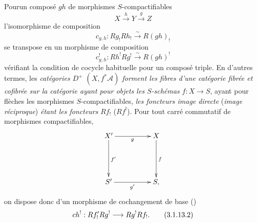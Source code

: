 \documentclass[10pt]{../fichiers-configuration-latex/smfart}
\begin{document}
\setcounter{subsubsection}{12}
\subsubsection{}
Pour\pageoriginale un composé $gh$ de morphismes $S$-compactifiables
$$
X\xrightarrow{h}Y\xrightarrow{g}Z
$$
l'isomorphisme de composition
$$
c_{g,h}:Rg_{!}Rh_{!}\xrightarrow{\sim} R(gh)_{!}
$$
se transpose en un morphisme de composition
\begin{equation*}
c^{!}_{g,h}:Rh^{!}Rg^{!}\xrightarrow{\sim} R(gh)^{!}\tag{3.1.13.1}
\end{equation*}%
vérifiant la condition de cocycle habituelle pour un composé
triple. En d'autres termes, les \emph{catégories $D^{+}$
$(X,f^{\ast}\mathcal{A})$ forment les fibres d'une catégorie fibrée et
cofibrée sur la catégorie ayant pour objets les $S$-schémas} $f:X\rightarrow
S$, ayant pour flèches les morphismes $S$-compactifiables, \emph{les
foncteurs image directe} (\resp \emph{image réciproque}) \emph{étant
les foncteurs} $Rf_{!}$ (\resp $Rf^{!}$). Pour tout carré commutatif
de morphismes compactifiables,
$$
\xymatrix@=1.75cm{
X' \ar[r]_{g} \ar[d]^{f'}& X \ar[d]^{f}\\
S' \ar[r]_{g'}& S,
}
$$
on dispose donc d'un morphisme de cochangement de base ()
\begin{equation*}
ch^{!}:Rf'_{!}Rg^{!}\longrightarrow Rg^{!} Rf_{!}{}.\tag{3.1.13.2}
\end{equation*}
\end{document}
